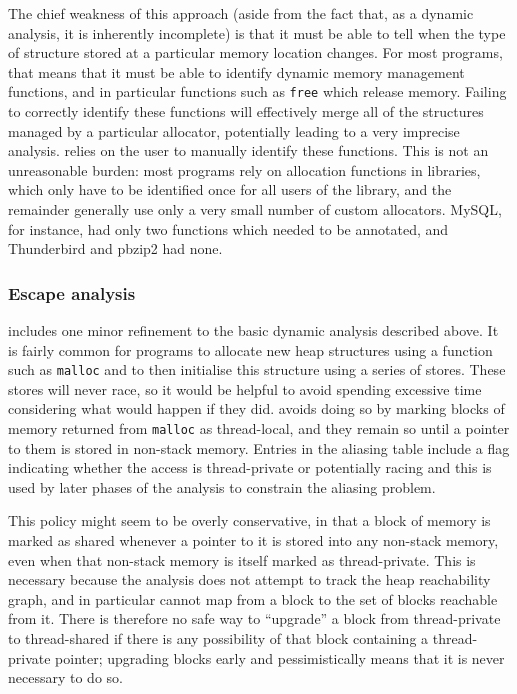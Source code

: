 The chief weakness of this approach (aside from the fact that, as a
dynamic analysis, it is inherently incomplete) is that it must be able
to tell when the type of structure stored at a particular memory
location changes.  For most programs, that means that it must be able
to identify dynamic memory management functions, and in particular
functions such as \texttt{free} which release memory.  Failing to
correctly identify these functions will effectively merge all of the
structures managed by a particular allocator, potentially leading to a
very imprecise analysis.  {\Technique} relies on the user to manually
identify these functions.  This is not an unreasonable burden: most
programs rely on allocation functions in libraries, which only have to
be identified once for all users of the library, and the remainder
generally use only a very small number of custom allocators.  MySQL,
for instance, had only two functions which needed to be annotated, and
Thunderbird and pbzip2 had none.

\subsubsection{Escape analysis}
{\Implementation} includes one minor refinement to the basic dynamic
analysis described above.  It is fairly common for programs to
allocate new heap structures using a function such as \texttt{malloc}
and to then initialise this structure using a series of stores.  These
stores will never race, so it would be helpful to avoid spending
excessive time considering what would happen if they did.
{\Technique} avoids doing so by marking blocks of memory returned from
\texttt{malloc} as thread-local, and they remain so until a pointer to
them is stored in non-stack memory.  Entries in the aliasing table
include a flag indicating whether the access is thread-private or
potentially racing and this is used by later phases of the analysis to
constrain the aliasing problem.

This policy might seem to be overly conservative, in that a block of
memory is marked as shared whenever a pointer to it is stored into any
non-stack memory, even when that non-stack memory is itself marked as
thread-private.  This is necessary because the analysis does not
attempt to track the heap reachability graph, and in particular cannot
map from a block to the set of blocks reachable from it.  There is
therefore no safe way to ``upgrade'' a block from thread-private to
thread-shared if there is any possibility of that block containing a
thread-private pointer; upgrading blocks early and pessimistically
means that it is never necessary to do so.

